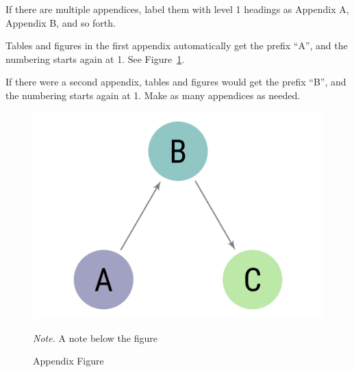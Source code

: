 \documentclass[
  jou,
  floatsintext,
  longtable,
  nolmodern,
  notxfonts,
  notimes,
  colorlinks=true,linkcolor=blue,citecolor=blue,urlcolor=blue]{apa7}
\begin{document}
If there are multiple appendices, label them with level 1 headings as
Appendix A, Appendix B, and so forth.

Tables and figures in the first appendix automatically get the prefix
``A'', and the numbering starts again at 1. See
Figure~\ref{fig-appendfig}.

If there were a second appendix, tables and figures would get the prefix
``B'', and the numbering starts again at 1. Make as many appendices as
needed.

\begin{figure}

{\caption{{Appendix Figure}{\label{fig-appendfig}}}}

\includegraphics{sampleimage.png}

{\noindent \emph{Note.} A note below the figure}

\end{figure}
\end{document}
